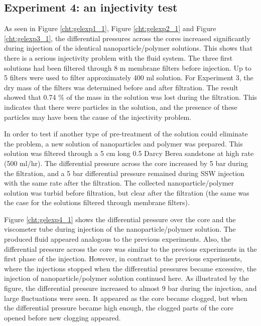 \subsection{Experiment 4: an injectivity test}
 As seen in Figure \ref{cht:gelexp1_1}, Figure \ref{cht:gelexp2_1} and Figure \ref{cht:gelexp3_1}, the differential pressures across the cores increased significantly during injection of the identical nanoparticle/polymer solutions. This shows that there is a serious injectivity problem with the fluid system. The three first solutions had been filtered through 8 \micro m membrane filters before injection. Up to 5 filters were used to filter approximately 400 ml solution. For Experiment 3, the dry mass of the filters was determined before and after filtration. The result showed that 0.74 \% of the mass in the solution was lost during the filtration. This indicates that there were particles in the solution, and the presence of these particles may have been the cause of the injectivity problem.

In order to test if another type of pre-treatment of the solution could eliminate the problem, a new solution of nanoparticles and polymer was prepared. This solution was filtered through a 5 cm long 0.5 Darcy Berea sandstone at high rate (500 ml/hr). The differential pressure across the core increased by 5 bar during the filtration, and a 5 bar differential pressure remained during SSW injection with the same rate after the filtration. The collected nanoparticle/polymer solution was turbid before filtration, but clear after the filtration (the same was the case for the solutions filtered through membrane filters).

Figure \ref{cht:gelexp4_1} shows the differential pressure over the core and the viscometer tube during injection of the nanoparticle/polymer solution. The produced fluid appeared analogous to the previous experiments. Also, the differential pressure across the core was similar to the previous experiments in the first phase of the injection. However, in contrast to the previous experiments, where the injections stopped when the differential pressures became excessive, the injection of nanoparticle/polymer solution continued here. As illustrated by the figure, the differential pressure increased to almost 9 bar during the injection, and large fluctuations were seen. It appeared as the core became clogged, but when the differential pressure became high enough, the clogged parts of the core opened before new clogging appeared.

